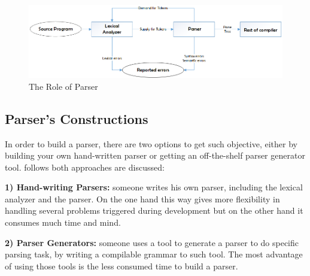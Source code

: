 {{{{{\begin{figure}[ht]
	\begin{center}
		\includegraphics[scale=0.5,angle=0]{images/ParserRole}
		\caption{The Role of Parser}
		\label{Fig:parserPosition}
	\end{center}
\end{figure}
\subsection{Parser's Constructions}
In order to build a parser, there are two options to get such objective, either by building your own hand-written parser or getting an off-the-shelf parser generator tool. follows both approaches are discussed:
\par \textbf{1) Hand-writing Parsers:} someone writes his own parser, including the lexical analyzer and the parser. On the one hand this way gives more flexibility in handling several problems triggered during development but on the other hand it consumes much time and mind.
\par \textbf{2) Parser Generators:} someone uses a tool to generate a parser to do specific parsing task, by writing a compilable grammar to such tool. The most advantage of using those tools is the less consumed time to build a parser.  

}}}}}

